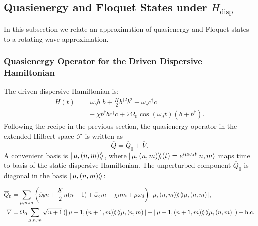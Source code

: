 \subsection{Quasienergy and Floquet States under $H_{\text{disp}}$}
In this subsection we relate an approximation of quasienergy and Floquet states to a rotating-wave approximation.
\subsubsection{Quasienergy Operator for the Driven Dispersive Hamiltonian}

The driven dispersive Hamiltonian is:
\begin{equation}
\begin{split}
\label{Driven dispersive}
    H(t) &= \bar{\omega}_b b^\dagger b + \frac{K}{2} b^{\dagger 2} b^2 + \bar{\omega}_c c^\dagger c \\
    &\quad + \chi b^\dagger b c^\dagger c + 2\Omega_0 \cos(\omega_d t) (b + b^\dagger).
\end{split}
\end{equation}
Following the recipe in the previous section, the quasienergy operator in the extended Hilbert space $\mathcal{F}$ is written as
\begin{equation}
    \overline{Q} = \overline{Q}_0 + \overline{V}.
\end{equation}
A convenient basis is $|\,\mu,(n,m)\rangle\!\rangle$, where $|\,\mu,(n,m)\rangle\!\rangle(t) = e^{i\mu\omega_dt}|n,m\rangle$ maps time to basis of the static dispersive Hamiltonian. The unperturbed component $\overline{Q}_0$ is diagonal in the basis $|\,\mu,(n,m)\rangle\!\rangle$:
\begin{widetext}
\begin{align}
\overline{Q}_0 &= \sum_{\mu,n,m} \left( \bar{\omega}_b n + \frac{K}{2} n(n-1) + \bar{\omega}_c m + \chi nm + \mu \omega_d \right)
|\,\mu,(n,m)\rangle\!\rangle\langle\!\langle\mu,(n,m)\,|, \\
\overline{V} &= \Omega_0 \sum_{\mu,n,m} \sqrt{n+1}
\left( |\,\mu+1,(n+1,m)\rangle\!\rangle\langle\!\langle\mu,(n,m)\,|
+ |\,\mu-1,(n+1,m)\rangle\!\rangle\langle\!\langle\mu,(n,m)\,| \right)
+ \text{h.c.}
\end{align}
\end{widetext}


